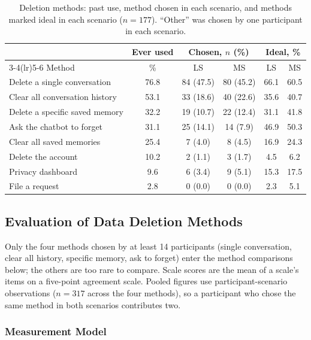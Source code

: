 \documentclass[conference,compsoc]{IEEEtran}
\begin{document}
\begin{table}[t]
\centering
\caption{Deletion methods: past use, method chosen in each scenario, and methods marked ideal in each scenario ($n=177$). ``Other'' was chosen by one participant in each scenario.}
\label{tab:method-usage}
\small
\begin{tabular}{lccccc}
\toprule
 & Ever used & \multicolumn{2}{c}{Chosen, $n$ (\%)} & \multicolumn{2}{c}{Ideal, \%} \\
\cmidrule(lr){3-4}\cmidrule(lr){5-6}
Method & \% & LS & MS & LS & MS \\
\midrule
Delete a single conversation & 76.8 & 84 (47.5) & 80 (45.2) & 66.1 & 60.5 \\
Clear all conversation history & 53.1 & 33 (18.6) & 40 (22.6) & 35.6 & 40.7 \\
Delete a specific saved memory & 32.2 & 19 (10.7) & 22 (12.4) & 31.1 & 41.8 \\
Ask the chatbot to forget & 31.1 & 25 (14.1) & 14 (7.9) & 46.9 & 50.3 \\
Clear all saved memories & 25.4 & 7 (4.0) & 8 (4.5) & 16.9 & 24.3 \\
Delete the account & 10.2 & 2 (1.1) & 3 (1.7) & 4.5 & 6.2 \\
Privacy dashboard & 9.6 & 6 (3.4) & 9 (5.1) & 15.3 & 17.5 \\
File a request & 2.8 & 0 (0.0) & 0 (0.0) & 2.3 & 5.1 \\
\bottomrule
\end{tabular}
\end{table}

\subsection{Evaluation of Data Deletion Methods}

Only the four methods chosen by at least 14 participants (single conversation, clear all history, specific memory, ask to forget) enter the method comparisons below; the others are too rare to compare. Scale scores are the mean of a scale's items on a five-point agreement scale. Pooled figures use participant-scenario observations ($n=317$ across the four methods), so a participant who chose the same method in both scenarios contributes two.

\subsubsection{Measurement Model}
\end{document}
